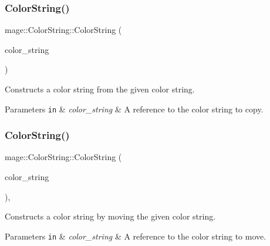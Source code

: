 \subsubsection{\texorpdfstring{Color\+String()}{ColorString()}\hspace{0.1cm}{\footnotesize\ttfamily [2/3]}}
{\footnotesize\ttfamily mage\+::\+Color\+String\+::\+Color\+String (\begin{DoxyParamCaption}\item[{const \hyperlink{classmage_1_1_color_string}{Color\+String} \&}]{color\+\_\+string }\end{DoxyParamCaption})\hspace{0.3cm}{\ttfamily [default]}}

Constructs a color string from the given color string.


\begin{DoxyParams}[1]{Parameters}
\mbox{\tt in}  & {\em color\+\_\+string} & A reference to the color string to copy. \\
\hline
\end{DoxyParams}
\hypertarget{classmage_1_1_color_string_a47afe208490b4c93daaa755f468d860a}{}\label{classmage_1_1_color_string_a47afe208490b4c93daaa755f468d860a} 
\subsubsection{\texorpdfstring{Color\+String()}{ColorString()}\hspace{0.1cm}{\footnotesize\ttfamily [3/3]}}
{\footnotesize\ttfamily mage\+::\+Color\+String\+::\+Color\+String (\begin{DoxyParamCaption}\item[{\hyperlink{classmage_1_1_color_string}{Color\+String} \&\&}]{color\+\_\+string }\end{DoxyParamCaption})\hspace{0.3cm}{\ttfamily [default]}, {\ttfamily [noexcept]}}

Constructs a color string by moving the given color string.


\begin{DoxyParams}[1]{Parameters}
\mbox{\tt in}  & {\em color\+\_\+string} & A reference to the color string to move. \\
\hline
\end{DoxyParams}
\hypertarget{classmage_1_1_color_string_a95886010269c8c4bc3a27fbfe829f4c2}{}\label{classmage_1_1_color_string_a95886010269c8c4bc3a27fbfe829f4c2} 
